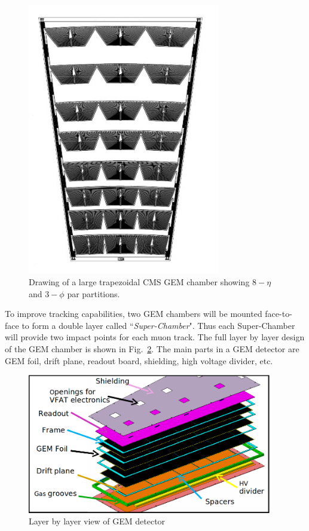 \begin{figure}[!htbp]
    \begin{center}
        \includegraphics[angle=-90,width=0.75\textwidth]{figures/GEM/gemTrapezoidal.png}
        \caption{Drawing of a large trapezoidal CMS GEM chamber showing $8-\eta$ and $3-\phi$ par partitions.}
        \label{fig:gemTrapezoidal}
    \end{center}
\end{figure} 
To improve tracking capabilities, two GEM chambers will be mounted face-to-face to form a double layer called ``\textit{Super-Chamber}".
Thus each Super-Chamber will provide two impact points for each muon track.
The full layer by layer design of the GEM chamber is shown in Fig.~\ref{fig:ge11}. 
The main parts in a GEM detector are GEM foil, drift plane, readout board, shielding, high voltage divider, etc.
\begin{figure}[!htbp]
    \begin{center}
        \includegraphics[width=0.95\textwidth]{figures/GEM/ge11cad.png}
        \caption{Layer by layer view of GEM detector}
        \label{fig:ge11}
    \end{center}
\end{figure} 
